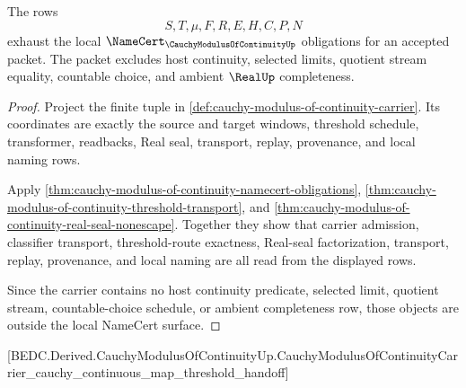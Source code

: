 \begin{theorem}
\label{thm:cauchy-modulus-of-continuity-local-namecert-surface}
The rows
$$
S,T,\mu,F,R,E,H,C,P,N
$$
exhaust the local $\NameCert_{\CauchyModulusOfContinuityUp}$ obligations for
an accepted packet. The packet excludes host continuity, selected limits,
quotient stream equality, countable choice, and ambient $\RealUp$
completeness.
\end{theorem}
\begin{proof}
Project the finite tuple in
\autoref{def:cauchy-modulus-of-continuity-carrier}. Its coordinates are
exactly the source and target windows, threshold schedule, transformer,
readbacks, Real seal, transport, replay, provenance, and local naming rows.

Apply
\autoref{thm:cauchy-modulus-of-continuity-namecert-obligations},
\autoref{thm:cauchy-modulus-of-continuity-threshold-transport}, and
\autoref{thm:cauchy-modulus-of-continuity-real-seal-nonescape}. Together they
show that carrier admission, classifier transport, threshold-route exactness,
Real-seal factorization, transport, replay, provenance, and local naming are
all read from the displayed rows.

Since the carrier contains no host continuity predicate, selected limit,
quotient stream, countable-choice schedule, or ambient completeness row, those
objects are outside the local NameCert surface.
\end{proof}

[BEDC.Derived.CauchyModulusOfContinuityUp.CauchyModulusOfContinuityCarrier\_cauchy\_continuous\_map\_threshold\_handoff]

